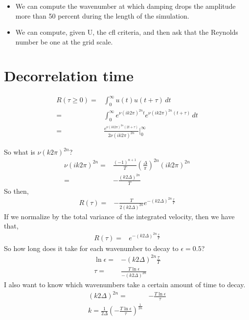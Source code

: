 \documentclass[11pt, oneside]{article}   	%
\begin{document}
\begin{itemize}
\item We can compute the wavenumber at which damping drops the amplitude more than 50 percent during the length of the simulation.
\item We can compute, given U, the cfl criteria, and then ask that the Reynolds number be one at the grid scale.
\end{itemize}



%
\section{Decorrelation time}
%

\begin{align}
R(\tau \geq 0) =& \int_0^\infty u(t)u(t+\tau) \, dt \\
=& \int_0^\infty e^{\nu (i k 2 \pi)^{2n} t} e^{\nu (i k 2 \pi)^{2n} (t + \tau) } \, dt \\
=& \frac{e^{ \nu (i k 2 \pi)^{2n} (2t + \tau)}}{2 \nu (i k 2 \pi)^{2n}} \biggr\rvert_0^\infty
\end{align}

So what is $\nu (k 2 \pi)^{2n}$?
\begin{align}
\nu (i k 2 \pi)^{2n} =&  \frac{(-1)^{n+1}}{T} \left( \frac{\Delta}{\pi} \right)^{2n}(i k 2 \pi)^{2n} \\
=& - \frac{(k 2 \Delta)^{2n}}{T} 
\end{align}
So then,
\begin{align}
R(\tau) =&- \frac{T} {2(k 2 \Delta)^{2n}} e^{ - (k 2 \Delta)^{2n}\frac{\tau}{T}} 
\end{align}
If we normalize by the total variance of the integrated velocity, then we have that,
\begin{align}
R(\tau) =& e^{ - (k 2 \Delta)^{2n}\frac{\tau}{T}} 
\end{align}
So how long does it take for each wavenumber to decay to $\epsilon=0.5$?
\begin{align}
\ln \epsilon =& - (k 2 \Delta)^{2n}\frac{\tau}{T} \\
\tau =& \frac{T \ln \epsilon}{- (k 2 \Delta)^{2n}}
\end{align}
I also want to know which wavenumbers take a certain amount of time to decay.
\begin{align}
(k 2 \Delta)^{2n} =& -\frac{T \ln \epsilon}{ \tau} \\
k = \frac{1}{2 \Delta} \left( -\frac{T \ln \epsilon}{ \tau} \right)^{\frac{1}{2n}}
\end{align}
\end{document}
